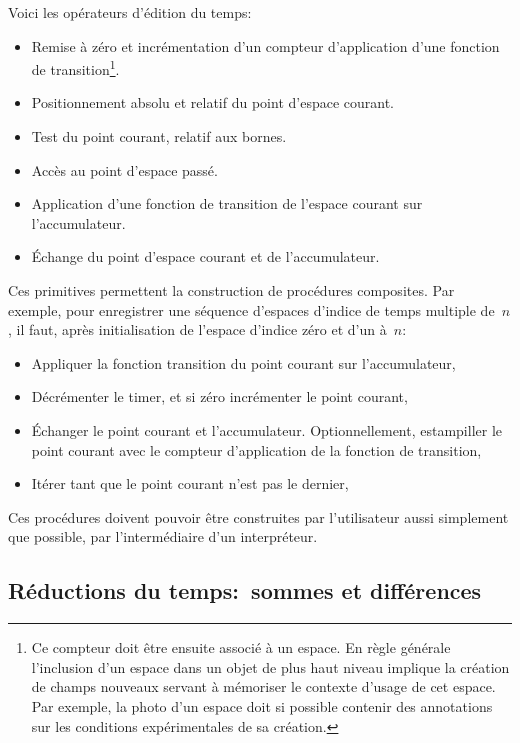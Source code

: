 Voici les opérateurs d'édition du temps:
\begin{itemize}
\item Remise à zéro et incrémentation d'un compteur d'application
  d'une fonction de transition\footnote{%
    Ce compteur doit être ensuite associé à un espace. %
    En règle générale l'inclusion d'un espace dans un objet de plus
    haut niveau implique la création de champs nouveaux servant à
    mémoriser le contexte d'usage de cet espace. %
    Par exemple, la photo d'un espace doit si possible contenir des
    annotations sur les conditions expérimentales de sa création.}. %
\item Positionnement absolu et relatif du point d'espace courant. %
\item Test du point courant, relatif aux bornes. %
\item Accès au point d'espace passé. %
\item Application d'une fonction de transition de l'espace courant sur
  l'accumulateur. %
\item Échange du point d'espace courant et de l'accumulateur. %
\end{itemize}

Ces primitives permettent la construction de procédures composites. %
Par exemple, pour enregistrer une séquence d'espaces d'indice de temps
multiple de~$n$, il faut, après initialisation de l'espace d'indice
zéro et d'un  à~$n$:
\begin{itemize}
\item Appliquer la fonction transition du point courant sur
  l'accumulateur,
\item Décrémenter le timer, et si zéro incrémenter le point courant,
\item Échanger le point courant et l'accumulateur. %
  Optionnellement, estampiller le point courant avec le compteur
  d'application de la fonction de transition,
\item Itérer tant que le point courant n'est pas le dernier,
\end{itemize}

Ces procédures doivent pouvoir être construites par l'utilisateur
aussi simplement que possible, par l'intermédiaire d'un interpréteur. %

\subsection{Réductions du temps:~sommes et différences}

